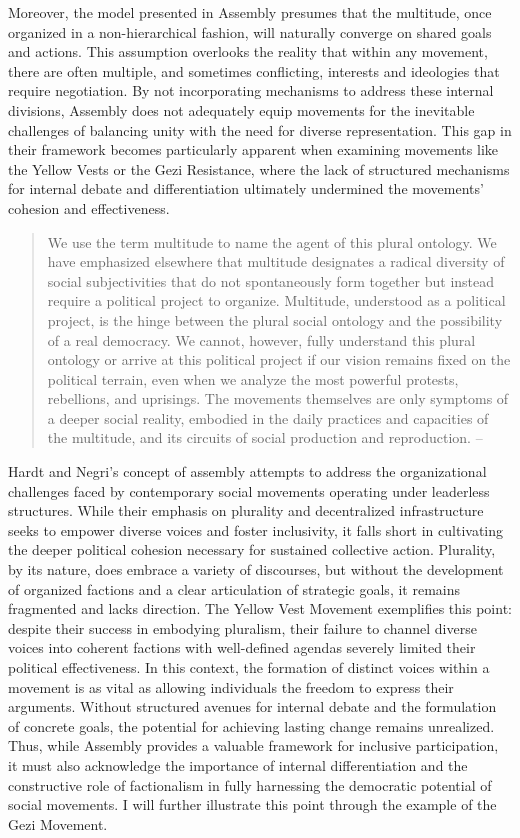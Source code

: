 Moreover, the model presented in Assembly presumes that the multitude, once organized in a non-hierarchical fashion, will naturally converge on shared goals and actions. This assumption overlooks the reality that within any movement, there are often multiple, and sometimes conflicting, interests and ideologies that require negotiation. By not incorporating mechanisms to address these internal divisions, Assembly does not adequately equip movements for the inevitable challenges of balancing unity with the need for diverse representation. This gap in their framework becomes particularly apparent when examining movements like the Yellow Vests or the Gezi Resistance, where the lack of structured mechanisms for internal debate and differentiation ultimately undermined the movements' cohesion and effectiveness.

\begin{quote} We use the term multitude to name the agent of this plural ontology. We have emphasized elsewhere that multitude designates a radical diversity of social subjectivities that do not spontaneously form together but instead require a political project to organize. Multitude, understood as a political project, is the hinge between the plural social ontology and the possibility of a real democracy. We cannot, however, fully understand this plural ontology or arrive at this political project if our vision remains fixed on the political terrain, even when we analyze the most powerful protests, rebellions, and uprisings. The movements themselves are only symptoms of a deeper social reality, embodied in the daily practices and capacities of the multitude, and its circuits of social production and reproduction. --\cite[69]{hardt2017} \end{quote}

Hardt and Negri's concept of assembly attempts to address the organizational challenges faced by contemporary social movements operating under leaderless structures. While their emphasis on plurality and decentralized infrastructure seeks to empower diverse voices and foster inclusivity, it falls short in cultivating the deeper political cohesion necessary for sustained collective action. Plurality, by its nature, does embrace a variety of discourses, but without the development of organized factions and a clear articulation of strategic goals, it remains fragmented and lacks direction. The Yellow Vest Movement exemplifies this point: despite their success in embodying pluralism, their failure to channel diverse voices into coherent factions with well-defined agendas severely limited their political effectiveness. In this context, the formation of distinct voices within a movement is as vital as allowing individuals the freedom to express their arguments. Without structured avenues for internal debate and the formulation of concrete goals, the potential for achieving lasting change remains unrealized. Thus, while Assembly provides a valuable framework for inclusive participation, it must also acknowledge the importance of internal differentiation and the constructive role of factionalism in fully harnessing the democratic potential of social movements. I will further illustrate this point through the example of the Gezi Movement.



